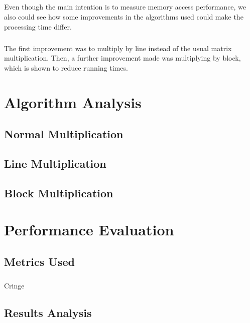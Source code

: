 \documentclass{report}
\begin{document}
    \paragraph{}Even though the main intention is to measure memory access performance, we also could see how some improvements in the algorithms used could make the processing time differ.

    \paragraph{}The first improvement was to multiply by line instead of the usual matrix multiplication. Then, a further improvement made was multiplying by block, which is shown to reduce running times.

    \chapter{Algorithm Analysis}

    \section{Normal Multiplication}

    \section{Line Multiplication}

    \section{Block Multiplication}

    \chapter{Performance Evaluation}

    \section{Metrics Used}

    \paragraph{}Cringe

    \section{Results Analysis}
\end{document}
